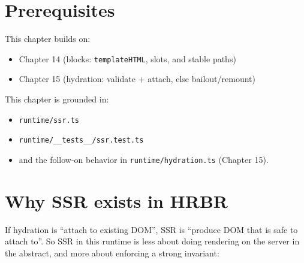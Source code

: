\section{Prerequisites}

This chapter builds on:

\begin{itemize}
  \item Chapter 14 (blocks: \texttt{templateHTML}, slots, and stable paths)
  \item Chapter 15 (hydration: validate + attach, else bailout/remount)
\end{itemize}

\begin{center}
\end{center}

This chapter is grounded in:

\begin{itemize}
  \item \texttt{runtime/ssr.ts}
  \item \texttt{runtime/\_\_tests\_\_/ssr.test.ts}
  \item and the follow-on behavior in \texttt{runtime/hydration.ts} (Chapter 15).
\end{itemize}

\section{Why SSR exists in HRBR}

If hydration is “attach to existing DOM”, SSR is “produce DOM that is safe to attach to”.
So SSR in this runtime is less about doing rendering on the server in the abstract, and more about enforcing a strong invariant:

